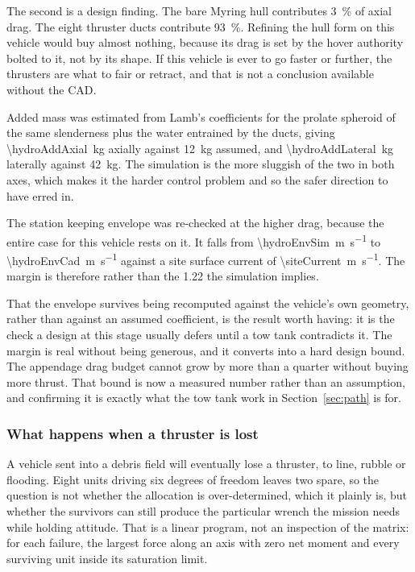 \documentclass[10pt,a4paper]{article}
\begin{document}
The second is a design finding. The bare Myring hull contributes
\SI{3}{\percent} of axial drag. The eight thruster ducts contribute
\SI{93}{\percent}. Refining the hull form on this vehicle would buy almost
nothing, because its drag is set by the hover authority bolted to it, not by
its shape. If this vehicle is ever to go faster or further, the thrusters are
what to fair or retract, and that is not a conclusion available without the
CAD.

Added mass was estimated from Lamb's coefficients for the prolate spheroid of
the same slenderness plus the water entrained by the ducts, giving
\SI{\hydroAddAxial}{\kilo\gram} axially against \SI{12}{\kilo\gram} assumed,
and \SI{\hydroAddLateral}{\kilo\gram} laterally against
\SI{42}{\kilo\gram}. The simulation is the more sluggish of the two in both
axes, which makes it the harder control problem and so the safer direction to
have erred in.

The station keeping envelope was re-checked at the higher drag, because the
entire case for this vehicle rests on it. It falls from
\SI{\hydroEnvSim}{\metre\per\second} to \SI{\hydroEnvCad}{\metre\per\second}
against a site surface current of \SI{\siteCurrent}{\metre\per\second}. The
margin is therefore \hydroMargin{} rather than the \num{1.22} the simulation
implies.

That the envelope survives being recomputed against the vehicle's own geometry,
rather than against an assumed coefficient, is the result worth having: it is
the check a design at this stage usually defers until a tow tank contradicts
it. The margin is real without being generous, and it converts into a hard
design bound. The appendage drag budget cannot grow by more than a quarter
without buying more thrust. That bound is now a measured number rather than an
assumption, and confirming it is exactly what the tow tank work in
Section~\ref{sec:path} is for.

\subsubsection{What happens when a thruster is lost}

A vehicle sent into a debris field will eventually lose a thruster, to line,
rubble or flooding. Eight units driving six degrees of freedom leaves two
spare, so the question is not whether the allocation is over-determined, which
it plainly is, but whether the survivors can still produce the particular
wrench the mission needs while holding attitude. That is a linear program, not
an inspection of the matrix: for each failure, the largest force along an axis
with zero net moment and every surviving unit inside its saturation limit.
\end{document}
